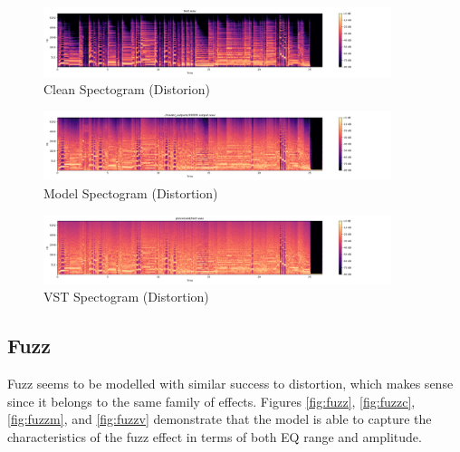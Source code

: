\documentclass{l4proj}
\begin{document}
\begin{figure}
\centering
\includegraphics[width=4.00000in]{images/distclean.png}
\caption{Clean Spectogram (Distorion)\label{fig:distortionsc}}
\end{figure}

\begin{figure}
\centering
\includegraphics[width=4.00000in]{images/distmodel.png}
\caption{Model Spectogram (Distortion)\label{fig:distortionsm}}
\end{figure}

\begin{figure}
\centering
\includegraphics[width=4.00000in]{images/distvstspect.png}
\caption{VST Spectogram (Distortion)\label{fig:distortionsv}}
\end{figure}

\subsection{Fuzz}\label{fuzz}

Fuzz seems to be modelled with similar success to distortion, which
makes sense since it belongs to the same family of effects. Figures
\ref{fig:fuzz}, \ref{fig:fuzzc}, \ref{fig:fuzzm}, and \ref{fig:fuzzv}
demonstrate that the model is able to capture the characteristics of the
fuzz effect in terms of both EQ range and amplitude.
\end{document}
